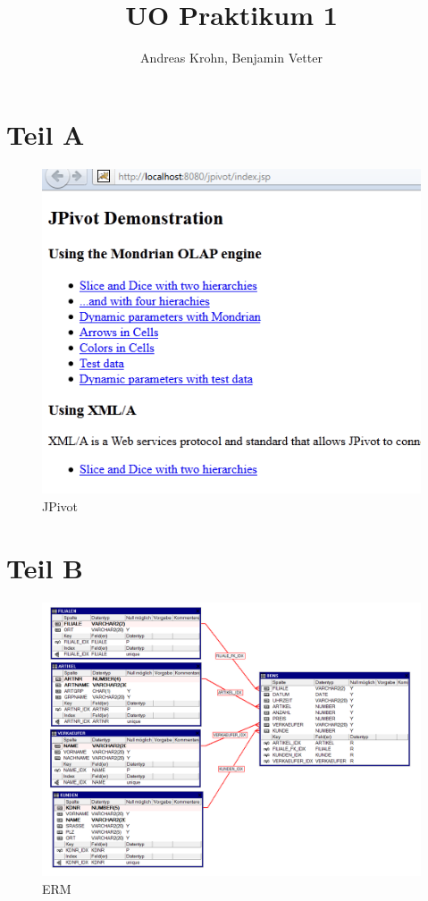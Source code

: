 \documentclass{scrreprt}
\begin{document}
\title{UO Praktikum 1}

\author{Andreas Krohn, Benjamin Vetter}

\lstset{
  breaklines=true,
  language=SQL,
  basicstyle=\ttfamily,
  showstringspaces=false
}

\maketitle

\chapter{Teil A}

\begin{figure}[h]
  \includegraphics[width=\textwidth]{screenshots/jpivot.png}
  \caption{JPivot}
\end{figure}

\chapter{Teil B}

\begin{figure}[h]
  \centering
  \includegraphics[width=\textwidth]{screenshots/erm.png}
  \caption{ERM}
\end{figure}
\end{document}
